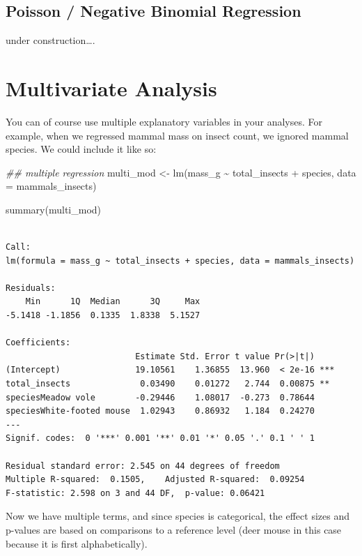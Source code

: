 \documentclass[
  letterpaper,
  DIV=11,
  numbers=noendperiod]{scrreprt}
\newenvironment{Shaded}{\begin{snugshade}}{\end{snugshade}}
\newcommand{\AttributeTok}[1]{\textcolor[rgb]{0.40,0.45,0.13}{#1}}
\newcommand{\DocumentationTok}[1]{\textcolor[rgb]{0.37,0.37,0.37}{\textit{#1}}}
\newcommand{\FunctionTok}[1]{\textcolor[rgb]{0.28,0.35,0.67}{#1}}
\newcommand{\NormalTok}[1]{\textcolor[rgb]{0.00,0.23,0.31}{#1}}
\newcommand{\OtherTok}[1]{\textcolor[rgb]{0.00,0.23,0.31}{#1}}
\newcommand{\SpecialCharTok}[1]{\textcolor[rgb]{0.37,0.37,0.37}{#1}}
\begin{document}
\subsection{Poisson / Negative Binomial
Regression}\label{poisson-negative-binomial-regression}

under construction\ldots.

\section{Multivariate Analysis}\label{multivariate-analysis}

You can of course use multiple explanatory variables in your analyses.
For example, when we regressed mammal mass on insect count, we ignored
mammal species. We could include it like so:

\begin{Shaded}
\begin{Highlighting}[]
\DocumentationTok{\#\# multiple regression}
\NormalTok{multi\_mod }\OtherTok{\textless{}{-}} \FunctionTok{lm}\NormalTok{(mass\_g }\SpecialCharTok{\textasciitilde{}}\NormalTok{ total\_insects }\SpecialCharTok{+}\NormalTok{ species, }\AttributeTok{data =}\NormalTok{ mammals\_insects)}

\FunctionTok{summary}\NormalTok{(multi\_mod)}
\end{Highlighting}
\end{Shaded}

\begin{verbatim}

Call:
lm(formula = mass_g ~ total_insects + species, data = mammals_insects)

Residuals:
    Min      1Q  Median      3Q     Max 
-5.1418 -1.1856  0.1335  1.8338  5.1527 

Coefficients:
                          Estimate Std. Error t value Pr(>|t|)    
(Intercept)               19.10561    1.36855  13.960  < 2e-16 ***
total_insects              0.03490    0.01272   2.744  0.00875 ** 
speciesMeadow vole        -0.29446    1.08017  -0.273  0.78644    
speciesWhite-footed mouse  1.02943    0.86932   1.184  0.24270    
---
Signif. codes:  0 '***' 0.001 '**' 0.01 '*' 0.05 '.' 0.1 ' ' 1

Residual standard error: 2.545 on 44 degrees of freedom
Multiple R-squared:  0.1505,    Adjusted R-squared:  0.09254 
F-statistic: 2.598 on 3 and 44 DF,  p-value: 0.06421
\end{verbatim}

Now we have multiple terms, and since species is categorical, the effect
sizes and p-values are based on comparisons to a reference level (deer
mouse in this case because it is first alphabetically).
\end{document}
